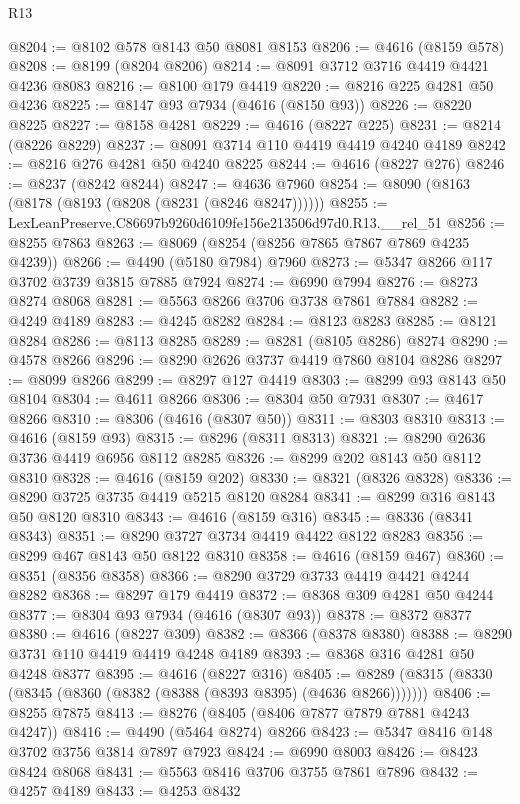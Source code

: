 \begin{lexlean}{R13}
\begin{coremodule}
@8204 := @8102 @578 @8143 @50 @8081 @8153
@8206 := @4616 (@8159 @578)
@8208 := @8199 (@8204 @8206)
@8214 := @8091 @3712 @3716 @4419 @4421 @4236 @8083
@8216 := @8100 @179 @4419
@8220 := @8216 @225 @4281 @50 @4236
@8225 := @8147 @93 @7934 (@4616 (@8150 @93))
@8226 := @8220 @8225
@8227 := @8158 @4281
@8229 := @4616 (@8227 @225)
@8231 := @8214 (@8226 @8229)
@8237 := @8091 @3714 @110 @4419 @4419 @4240 @4189
@8242 := @8216 @276 @4281 @50 @4240 @8225
@8244 := @4616 (@8227 @276)
@8246 := @8237 (@8242 @8244)
@8247 := @4636 @7960
@8254 := @8090 (@8163 (@8178 (@8193 (@8208 (@8231 (@8246 @8247))))))
@8255 := LexLeanPreserve.C86697b9260d6109fe156e213506d97d0.R13.__rel_51
@8256 := @8255 @7863
@8263 := @8069 (@8254 (@8256 @7865 @7867 @7869 @4235 @4239))
@8266 := @4490 (@5180 @7984) @7960
@8273 := @5347 @8266 @117 @3702 @3739 @3815 @7885 @7924
@8274 := @6990 @7994
@8276 := @8273 @8274 @8068
@8281 := @5563 @8266 @3706 @3738 @7861 @7884
@8282 := @4249 @4189
@8283 := @4245 @8282
@8284 := @8123 @8283
@8285 := @8121 @8284
@8286 := @8113 @8285
@8289 := @8281 (@8105 @8286) @8274
@8290 := @4578 @8266
@8296 := @8290 @2626 @3737 @4419 @7860 @8104 @8286
@8297 := @8099 @8266
@8299 := @8297 @127 @4419
@8303 := @8299 @93 @8143 @50 @8104
@8304 := @4611 @8266
@8306 := @8304 @50 @7931
@8307 := @4617 @8266
@8310 := @8306 (@4616 (@8307 @50))
@8311 := @8303 @8310
@8313 := @4616 (@8159 @93)
@8315 := @8296 (@8311 @8313)
@8321 := @8290 @2636 @3736 @4419 @6956 @8112 @8285
@8326 := @8299 @202 @8143 @50 @8112 @8310
@8328 := @4616 (@8159 @202)
@8330 := @8321 (@8326 @8328)
@8336 := @8290 @3725 @3735 @4419 @5215 @8120 @8284
@8341 := @8299 @316 @8143 @50 @8120 @8310
@8343 := @4616 (@8159 @316)
@8345 := @8336 (@8341 @8343)
@8351 := @8290 @3727 @3734 @4419 @4422 @8122 @8283
@8356 := @8299 @467 @8143 @50 @8122 @8310
@8358 := @4616 (@8159 @467)
@8360 := @8351 (@8356 @8358)
@8366 := @8290 @3729 @3733 @4419 @4421 @4244 @8282
@8368 := @8297 @179 @4419
@8372 := @8368 @309 @4281 @50 @4244
@8377 := @8304 @93 @7934 (@4616 (@8307 @93))
@8378 := @8372 @8377
@8380 := @4616 (@8227 @309)
@8382 := @8366 (@8378 @8380)
@8388 := @8290 @3731 @110 @4419 @4419 @4248 @4189
@8393 := @8368 @316 @4281 @50 @4248 @8377
@8395 := @4616 (@8227 @316)
@8405 := @8289 (@8315 (@8330 (@8345 (@8360 (@8382 (@8388 (@8393 @8395) (@4636 @8266)))))))
@8406 := @8255 @7875
@8413 := @8276 (@8405 (@8406 @7877 @7879 @7881 @4243 @4247))
@8416 := @4490 (@5464 @8274) @8266
@8423 := @5347 @8416 @148 @3702 @3756 @3814 @7897 @7923
@8424 := @6990 @8003
@8426 := @8423 @8424 @8068
@8431 := @5563 @8416 @3706 @3755 @7861 @7896
@8432 := @4257 @4189
@8433 := @4253 @8432

\end{coremodule}
\end{lexlean}
